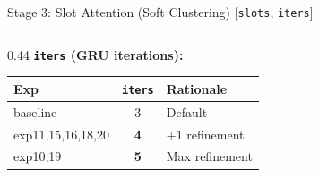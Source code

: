 \documentclass[aspectratio=169, 10pt]{beamer}
\newcommand{\param}[1]{\textcolor{paramred}{\texttt{#1}}}
\begin{document}
\begin{frame}{Stage 3: Slot Attention (Soft Clustering) \quad\small[\param{slots}, \param{iters}]}
\begin{columns}[T]
\begin{column}{0.44\textwidth}
\vspace{0.3cm}
\textbf{\param{iters} (GRU iterations):}
\begin{center}
\small
\begin{tabular}{lcl}
\toprule
Exp & \param{iters} & Rationale \\
\midrule
baseline & 3 & Default \\
exp11,15,16,18,20 & \textbf{4} & +1 refinement \\
exp10,19 & \textbf{5} & Max refinement \\
\bottomrule
\end{tabular}
\end{center}
\end{column}
\end{columns}

\end{frame}
\end{document}
